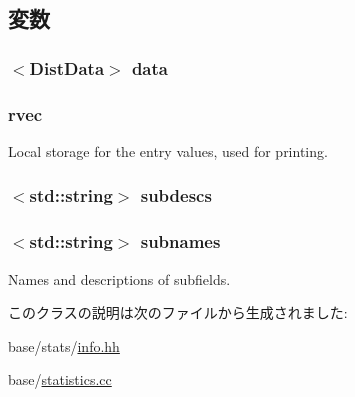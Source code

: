 \subsection{変数}
\hypertarget{classStats_1_1VectorDistInfo_af1c9f5a3b68f4b752f129d4c834f3f78}{
\subsubsection[{data}]{$<${\bf DistData}$>$ {\bf data}}}
\label{classStats_1_1VectorDistInfo_af1c9f5a3b68f4b752f129d4c834f3f78}
\hypertarget{classStats_1_1VectorDistInfo_a39641e85a212191bbc9d5d6293522515}{
\subsubsection[{rvec}]{ {\bf rvec}}}
\label{classStats_1_1VectorDistInfo_a39641e85a212191bbc9d5d6293522515}
Local storage for the entry values, used for printing. \hypertarget{classStats_1_1VectorDistInfo_a722488efce925fb896e4111f77731f25}{
\subsubsection[{subdescs}]{$<$std::string$>$ {\bf subdescs}}}
\label{classStats_1_1VectorDistInfo_a722488efce925fb896e4111f77731f25}
\hypertarget{classStats_1_1VectorDistInfo_a3b95ca426d97cab365cc623926fdd294}{
\subsubsection[{subnames}]{$<$std::string$>$ {\bf subnames}}}
\label{classStats_1_1VectorDistInfo_a3b95ca426d97cab365cc623926fdd294}
Names and descriptions of subfields. 

このクラスの説明は次のファイルから生成されました:\begin{DoxyCompactItemize}
\item 
base/stats/\hyperlink{info_8hh}{info.hh}\item 
base/\hyperlink{statistics_8cc}{statistics.cc}\end{DoxyCompactItemize}
